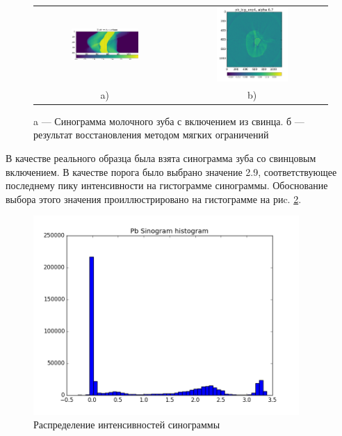 \begin{figure}
\centering
\begin{tabular}{@{}c@{}c}
    \includegraphics[width=0.50\textwidth]{Dissertation/images/part2_img/tooth_sino}
&
    \includegraphics[width=0.50\textwidth]{Dissertation/images/part2_img/soft_ineq_pb_tooth}
\\
   \small a) & \small b)
\end{tabular}
  \caption{a --- Синограмма молочного зуба с включением из свинца. б --- результат восстановления методом мягких ограничений}
\label{fig:tooth_sino_rec}
\end{figure}

В качестве реального образца была взята синограмма зуба со свинцовым включением.
В качестве порога было выбрано значение 2.9, соответствующее последнему пику интенсивности на гистограмме синограммы.
Обоснование выбора этого значения проиллюстрировано на гистограмме на риc. \ref{fig:pb_hist}.


\begin{figure}
	\centering
	\includegraphics[width=0.9\textwidth]{Dissertation/images/part2_img/pb_hist}
	\caption{Распределение интенсивностей синограммы}
	\label{fig:pb_hist}
\end{figure}



